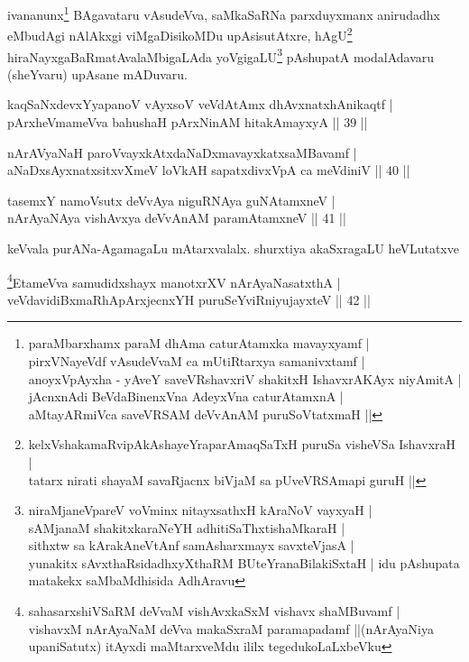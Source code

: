 \begin{artha}%
ivananunx\footnote{paraMbarxhamx paraM dhAma caturAtamxka mavayxyamf |\\
pirxVNayeVdf vAsudeVvaM ca mUtiRtarxya samanivxtamf |\\
anoyxVpAyxha - yAveY saveVRshavxriV shakitxH IshavxrAKAyx niyAmitA |\\
jAcnxnAdi BeVdaBinenxVna AdeyxVna caturAtamxnA |\\
aMtayARmiVca saveVRSAM deVvAnAM puruSoVtatxmaH ||} BAgavataru vAsudeVva, saMkaSaRNa parxduyxmanx anirudadhx eMbudAgi nAlAkxgi viMgaDisikoMDu upAsisutAtxre, hAgU\footnote{kelxVshakamaRvipAkAshayeYraparAmaqSaTxH puruSa visheVSa IshavxraH |\\tatarx nirati shayaM savaRjacnx biVjaM sa pUveVRSAmapi guruH ||} hiraNayxgaBaRmatAvalaMbigaLAda yoVgigaLU\footnote{niraMjaneVpareV voVminx nitayxsathxH kAraNoV vayxyaH |\\
sAMjanaM shakitxkaraNeYH adhitiSaThxtishaMkaraH |\\
sithxtw sa kArakAneVtAnf samAsharxmayx savxteVjasA | \\
yunakitx sAvxthaRsidadhxyXthaRM BUteYranaBilakiSxtaH | idu pAshupata matakekx saMbaMdhisida AdhAravu} pAshupatA modalAdavaru (sheYvaru) upAsane mADuvaru.
\end{artha}

\begin{shl}
kaqSaNxdevxYyapanoV vAyxsoV veVdAtAmx dhAvxnatxhAnikaqtf |\\
pArxheVmameVva bahushaH pArxNinAM hitakAmayxyA \hfill || 39 ||
\end{shl}

\begin{shl}
nArAVyaNaH paroV\s vayxkAtxdaNaDxmavayxkatxsaMBavamf |\\
aNaDxsAyxnatxsitxvXmeV loVkAH sapatxdivxVpA ca meVdiniV \hfill || 40 ||
\end{shl}

\begin{shl}
tasemxY namoV\s sutx deVvAya niguRNAya guNAtamxneV |\\
nArAyaNAya vishAvxya deVvAnAM paramAtamxneV \hfill || 41 ||
\end{shl}

\begin{artha}
keVvala purANa-AgamagaLu mAtarxvalalx. shurxtiya akaSxragaLU heVLutatxve
\end{artha}

\begin{shl}
\footnote{sahasarxshiVSaRM deVvaM vishAvxkaSxM vishavx shaMBuvamf |\\
vishavxM nArAyaNaM deVva makaSxraM paramapadamf ||(nArAyaNiya upaniSatutx) itAyxdi maMtarxveMdu ililx tegedukoLaLxbeVku}EtameVva samudidxshayx manotxrXV nArAyaNasatxthA |\\
veVdavidiBxmaRhApArxjecnxYH puruSeYviRniyujayxteV \hfill || 42 ||
\end{shl}

